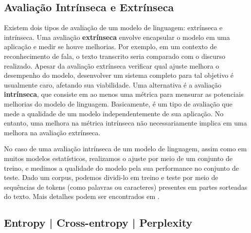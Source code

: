 \documentclass{automatextcc}
\begin{document}
\subsection{Avaliação Intrínseca e Extrínseca}
Existem dois tipos de avaliação de um modelo de linguagem: extrínseca e intrínseca. Uma avaliação \textbf{extrínseca} envolve encapsular o modelo em uma aplicação e medir se houve melhorias. Por exemplo, em um contexto de reconhecimento de fala, o texto transcrito seria comparado com o discurso realizado. Apesar da avaliação extrínseca verificar qual ajuste melhora o desempenho do modelo, desenvolver um sistema completo para tal objetivo é usualmente caro, afetando sua viabilidade. Uma alternativa é a avaliação \textbf{intrínseca}, que consiste em ao menos uma métrica para mensurar as potenciais melhorias do modelo de linguagem. Basicamente, é um tipo de avaliação que mede a qualidade de um modelo independentemente de sua aplicação. No entanto, uma melhora na métrica intrínseca não necessariamente implica em uma melhora na avaliação extrínseca. 

No caso de uma avaliação intrínseca de um modelo de linguagem, assim como em muitos modelos estatísticos, realizamos o ajuste por meio de um conjunto de treino, e medimos a qualidade do modelo pela sua performance no conjunto de teste. Dado um corpus, podemos dividi-lo em treino e teste por meio de sequências de tokens (como palavras ou caracteres) presentes em partes sorteadas do texto. Mais detalhes podem ser encontrados em \citet{goldberg2017, jurafsky2021}.


\subsection{Entropy | Cross-entropy | Perplexity}
\end{document}
